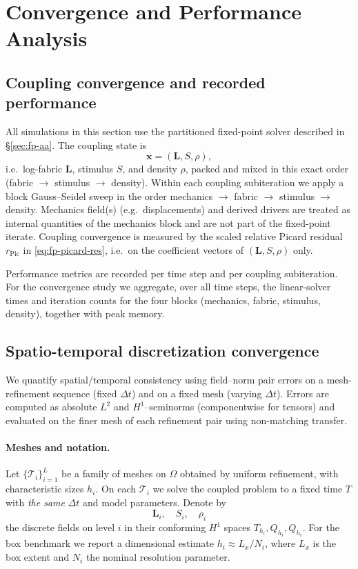 \section{Convergence and Performance Analysis}
\label{app:convergence}
\subsection*{Coupling convergence and recorded performance}

All simulations in this section use the partitioned fixed-point solver described in \S\ref{sec:fp-aa}.
The coupling state is
\[
\mathbf{x}=(\mathbf{L},S,\rho),
\]
i.e.\ log-fabric $\mathbf{L}$, stimulus $S$, and density $\rho$, packed and mixed in this exact order (fabric $\rightarrow$ stimulus $\rightarrow$ density).
Within each coupling subiteration we apply a block Gauss--Seidel sweep in the order mechanics $\rightarrow$ fabric $\rightarrow$ stimulus $\rightarrow$ density.
Mechanics field(s) (e.g.\ displacements) and derived drivers are treated as internal quantities of the mechanics block and are not part of the fixed-point iterate.
Coupling convergence is measured by the scaled relative Picard residual $r_{\mathrm{Pic}}$ in \eqref{eq:fp-picard-res}, i.e.\ on the coefficient vectors of $(\mathbf{L},S,\rho)$ only.

Performance metrics are recorded per time step and per coupling subiteration.
For the convergence study we aggregate, over all time steps, the linear-solver times and iteration counts for the four blocks (mechanics, fabric, stimulus, density), together with peak memory.

\subsection*{Spatio-temporal discretization convergence}

We quantify spatial/temporal consistency using field–norm pair errors on a mesh-refinement sequence (fixed $\Delta t$) and on a fixed mesh (varying $\Delta t$).
Errors are computed as absolute $L^2$ and $H^1$--seminorms (componentwise for tensors) and evaluated on the finer mesh of each refinement pair using non-matching transfer.

\paragraph{Meshes and notation.}
Let $\{\mathcal{T}_i\}_{i=1}^L$ be a family of meshes on $\Omega$ obtained by uniform refinement, with characteristic sizes $h_i$.
On each $\mathcal{T}_i$ we solve the coupled problem to a fixed time $T$ with \emph{the same} $\Delta t$ and model parameters.
Denote by
\[
\mathbf{L}_i,\quad S_i,\quad \rho_i
\]
the discrete fields on level $i$ in their conforming $H^1$ spaces $T_{h_i},Q_{h_i},Q_{h_i}$.
For the box benchmark we report a dimensional estimate $h_i \approx L_x/N_i$, where $L_x$ is the box extent and $N_i$ the nominal resolution parameter.

